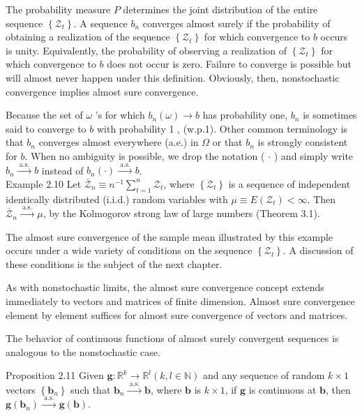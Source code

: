 \documentclass[10pt]{article}
\begin{document}
The probability measure $P$ determines the joint distribution of the entire sequence $\left\{\mathcal{Z}_{t}\right\}$. A sequence $b_{n}$ converges almost surely if the probability of obtaining a realization of the sequence $\left\{\mathcal{Z}_{t}\right\}$ for which convergence to $b$ occurs is unity. Equivalently, the probability of observing a realization of $\left\{\mathcal{Z}_{t}\right\}$ for which convergence to $b$ does not occur is zero. Failure to converge is possible but will almost never happen under this definition. Obviously, then, nonstochastic convergence implies almost sure convergence.

Because the set of $\omega$ 's for which $b_{n}(\omega) \rightarrow b$ has probability one, $b_{n}$ is sometimes said to converge to $b$ with probability 1 , (w.p.1). Other common terminology is that $b_{n}$ converges almost everywhere (a.e.) in $\Omega$ or that $b_{n}$ is strongly consistent for $b$. When no ambiguity is possible, we drop the notation ( $\cdot$ ) and simply write $b_{n} \xrightarrow{\text { a.s. }} b$ instead of $b_{n}(\cdot) \xrightarrow{\text { a.s. }} b$.\\
Example 2.10 Let $\overline{\mathcal{Z}}_{n} \equiv n^{-1} \sum_{t=1}^{n} \mathcal{Z}_{t}$, where $\left\{\mathcal{Z}_{t}\right\}$ is a sequence of independent identically distributed (i.i.d.) random variables with $\mu \equiv E\left(\mathcal{Z}_{t}\right)< \infty$. Then $\overline{\mathcal{Z}}_{n} \xrightarrow{\text { a.s. }} \mu$, by the Kolmogorov strong law of large numbers (Theorem 3.1).

The almost sure convergence of the sample mean illustrated by this example occurs under a wide variety of conditions on the sequence $\left\{\mathcal{Z}_{t}\right\}$. A discussion of these conditions is the subject of the next chapter.

As with nonstochastic limits, the almost sure convergence concept extends immediately to vectors and matrices of finite dimension. Almost sure convergence element by element suffices for almost sure convergence of vectors and matrices.

The behavior of continuous functions of almost surely convergent sequences is analogous to the nonstochastic case.

Proposition 2.11 Given $\mathbf{g}: \mathbb{R}^{k} \rightarrow \mathbb{R}^{l}(k, l \in \mathbb{N})$ and any sequence of random $k \times 1$ vectors $\left\{\mathbf{b}_{n}\right\}$ such that $\mathbf{b}_{n} \xrightarrow{\text { a.s. }} \mathbf{b}$, where $\mathbf{b}$ is $k \times 1$, if $\mathbf{g}$ is continuous at $\mathbf{b}$, then $\mathbf{g}\left(\mathbf{b}_{n}\right) \xrightarrow{\text { a.s. }} \mathbf{g}(\mathbf{b})$.
\end{document}
